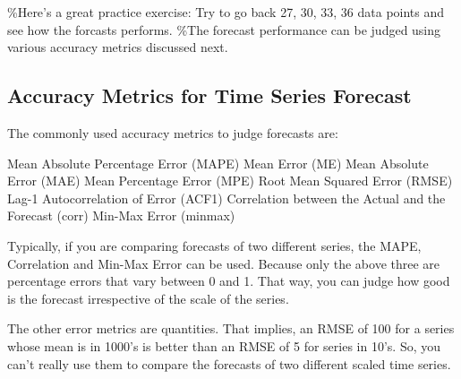 \%Here's a great practice exercise: Try to go back 27, 30, 33, 36 data
points and see how the forcasts performs. \%The forecast performance can
be judged using various accuracy metrics discussed next.

\subsection{Accuracy Metrics for Time Series
Forecast}\label{accuracy-metrics-for-time-series-forecast}

The commonly used accuracy metrics to judge forecasts are:

Mean Absolute Percentage Error (MAPE) Mean Error (ME) Mean Absolute
Error (MAE) Mean Percentage Error (MPE) Root Mean Squared Error (RMSE)
Lag-1 Autocorrelation of Error (ACF1) Correlation between the Actual and
the Forecast (corr) Min-Max Error (minmax)

Typically, if you are comparing forecasts of two different series, the
MAPE, Correlation and Min-Max Error can be used. Because only the above
three are percentage errors that vary between 0 and 1. That way, you can
judge how good is the forecast irrespective of the scale of the series.

The other error metrics are quantities. That implies, an RMSE of 100 for
a series whose mean is in 1000's is better than an RMSE of 5 for series
in 10's. So, you can't really use them to compare the forecasts of two
different scaled time series.

